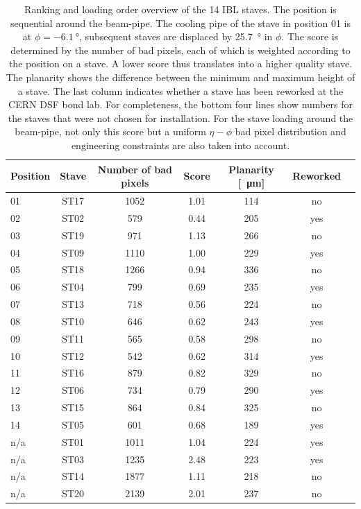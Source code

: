 \begin{table}
\renewcommand{\arraystretch}{1.4}
\centering
\begin{tabular}{lcccccc}
\hline \hline
Position & Stave & Number of bad pixels & Score & Planarity [\SI{}{\micro\meter}] & Reworked \\
\hline
01 & ST17  & 1052 & 1.01 & 114 & no \\
02 & ST02 & 579 & 0.44 & 205 & yes \\
03 & ST19  & 971 & 1.13 & 266 & no\\
04 & ST09   & 1110 & 1.00 & 229 & yes \\
05 & ST18   & 1266 & 0.94 & 336 & no\\
06 & ST04   & 799 & 0.69 & 235 & yes \\
07 & ST13   & 718 & 0.56 & 224 & no\\
08 & ST10   & 646 & 0.62 & 243 & yes \\
09 & ST11   & 565 & 0.58 & 298 & no \\
10 & ST12   & 542 & 0.62 & 314 & yes \\
11 & ST16   & 879 & 0.82 & 329 & no \\
12 & ST06   & 734 & 0.79 & 290 & yes \\
13 & ST15   & 864 & 0.84 & 325 & no \\
14 & ST05   & 601 & 0.68 & 189& yes\\ \hline
n/a & ST01 & 1011 & 1.04 & 224 & yes\\
n/a & ST03 & 1235 & 2.48 & 223 & yes\\
n/a & ST14 & 1877 & 1.11 & 218 & no\\
n/a & ST20 & 2139 & 2.01 & 237 & no\\
\hline \hline
\end{tabular}
\caption{Ranking and loading order overview of the 14 IBL staves. The position is sequential around the beam-pipe. The cooling pipe of the stave in position 01 is at $\phi = \SI{-6.1}{\degree}$, subsequent staves are displaced by \SI{25.7}{\degree} in $\phi$. The score is determined by the number of bad pixels, each of which is weighted according to the position on a stave. A lower score thus translates into a higher quality stave. The planarity shows the difference between the minimum and maximum height of a stave. The last column indicates whether a stave has been reworked at the CERN DSF bond lab. For completeness, the bottom four lines show numbers for the staves that were not chosen for installation. For the stave loading around the beam-pipe, not only this score but a uniform $\eta-\phi$ bad pixel distribution and engineering constraints are also taken into account.}
\label{table:rankingsummary}
\end{table}



